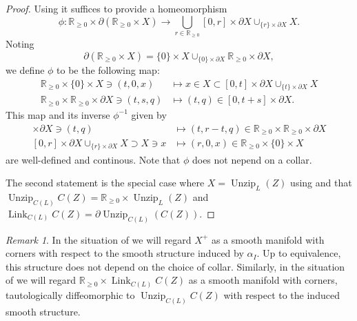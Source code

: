 \documentclass[11pt]{amsart}
\newcommand{\mbb}[1]{\mathbb{#1}}
\newcommand{\R}{\mbb{R}}
\DeclareMathOperator{\Unzip}{Unzip}
\DeclareMathOperator{\Link}{Link}
\numberwithin{equation}{section}
\theoremstyle{definition}
\theoremstyle{remark}
\newtheorem{remark}[equation]{Remark}
\theoremstyle{plain}
\begin{document}
\begin{proof}
    Using  it suffices to provide a homeomorphism
    \[
        \phi\colon\R_{\geq0}\times\partial(\R_{\geq0}\times X)\to\bigcup_{r\in\R_{\geq0}}[0,r]\times\partial X\cup_{\{r\}\times\partial X}X.
    \]
    Noting 
    \[
        \partial(\R_{\geq0}\times X)=\{0\}\times X\cup_{\{0\}\times \partial X}\R_{\geq0}\times\partial X,
    \] 
    we define $\phi$ to be the following map: 
    \begin{align*}
        \R_{\geq0}\times\{0\}\times X\ni (t,0,x)&\mapsto x\in X\subset[0,t]\times \partial X\cup_{\{t\}\times\partial X}X\\
        \R_{\geq0}\times\R_{\geq0}\times\partial X\ni(t,s,q)&\mapsto (t,q)\in[0,t+s]\times\partial X.
    \end{align*}
    This map and its inverse $\phi^{-1}$ given by
    \begin{align*}
        [0,r]\times\partial X \ni (t,q) &\mapsto (t,r-t,q)\in \R_{\geq0}\times\R_{\geq0}\times\partial X\\
        [0,r]\times\partial X\cup_{\{r\}\times\partial X}X\supset X\ni x&\mapsto (r,0,x)\in\R_{\geq0}\times\{0\}\times X
    \end{align*}
    are well-defined and continous. Note that $\phi$ does not nepend on a collar.

    The second statement is the special case where $X=\Unzip_L(Z)$ using  and that $\Unzip_{C(L)} C(Z)=\R_{\geq0}\times \Unzip_L(Z)$ and $\Link_{C(L)}C(Z)=\partial\Unzip_{C(L)}(C(Z))$.  
\end{proof}

\begin{remark}
    In the situation of  we will regard $X^+$ as a smooth manifold with corners with respect to the smooth structure induced by $\alpha_I$. Up to equivalence, this structure does not depend on the choice of collar. Similarly, in the situation of  we will regard $\R_{\geq0}\times\Link_{C(L)}C(Z)$ as a smooth manifold with corners, tautologically diffeomorphic to $\Unzip_{C(L)}C(Z)$ with respect to the induced smooth structure.
\end{remark}
\end{document}
